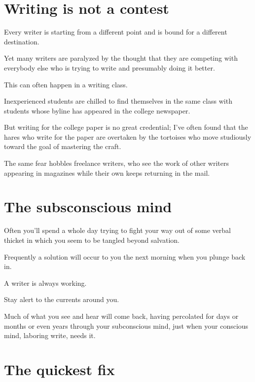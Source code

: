 \documentclass{book}
\numberwithin{equation}{section}
\begin{document}
\section{Writing is not a contest}
Every writer is starting from a different point and is bound for a different destination.

Yet many writers are paralyzed by the thought that they are competing with everybody else who is trying to write and presumably doing it better.

This can often happen in a writing class.

Inexperienced students are chilled to find themselves in the same class with students whose byline has appeared in the college newspaper.

But writing for the college paper is no great credential; I've often found that the hares who write for the paper are overtaken by the tortoises who move studiously toward the goal of mastering the craft.

The same fear hobbles freelance writers, who see the work of other writers appearing in magazines while their own keeps returning in the mail.



\section{The subsconscious mind}

Often you'll spend a whole day trying to fight your way out of some verbal thicket in which you seem to be tangled beyond salvation.

Frequently a solution will occur to you the next morning when you plunge back in.


A writer is always working.

Stay alert to the currents around you.

Much of what you see and hear will come back, having percolated for days or months or even years through your subconscious mind, just when your conscious mind, laboring write, needs it.

\section{The quickest fix}
\end{document}
